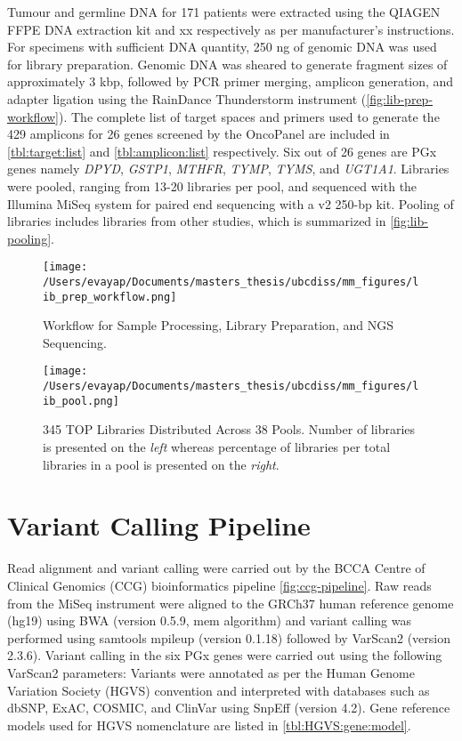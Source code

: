 Tumour and germline DNA for 171 patients were extracted using the QIAGEN FFPE DNA extraction kit and xx respectively as per manufacturer's instructions. For specimens with sufficient DNA quantity, 250 ng of genomic DNA was used for library preparation. Genomic DNA was sheared to generate fragment sizes of approximately 3 kbp, followed by PCR primer merging, amplicon generation, and adapter ligation using the RainDance Thunderstorm instrument (\autoref{fig:lib-prep-workflow}). The complete list of target spaces and primers used to generate the 429 amplicons for 26 genes screened by the OncoPanel are included in \autoref{tbl:target:list} and \autoref{tbl:amplicon:list} respectively. Six out of 26 genes are PGx genes namely \textit{DPYD}, \textit{GSTP1}, \textit{MTHFR}, \textit{TYMP}, \textit{TYMS}, and \textit{UGT1A1}. Libraries were pooled, ranging from 13-20 libraries per pool, and sequenced with the Illumina MiSeq system for paired end sequencing with a v2 250-bp kit. Pooling of libraries includes libraries from other studies, which is summarized in \autoref{fig:lib-pooling}.

\begin{figure}
    \centering
    \texttt{[image: /Users/evayap/Documents/masters\_thesis/ubcdiss/mm\_figures/lib\_prep\_workflow.png]}
    \caption{Workflow for Sample Processing, Library Preparation, and NGS Sequencing.}
    \label{fig:lib-prep-workflow}   %
\end{figure}

\begin{figure}
    \centering
    \texttt{[image: /Users/evayap/Documents/masters\_thesis/ubcdiss/mm\_figures/lib\_pool.png]}
    \caption{345 TOP Libraries Distributed Across 38 Pools. Number of libraries is presented on the \textit{left} whereas percentage of libraries per total libraries in a pool is presented on the \textit{right}.}
    \label{fig:lib-pooling}   %
\end{figure}

\section{Variant Calling Pipeline}
\label{sec:VariantCallingPipeline}

Read alignment and variant calling were carried out by the BCCA Centre of Clinical Genomics (CCG) bioinformatics pipeline \autoref{fig:ccg-pipeline}. Raw reads from the MiSeq instrument were aligned to the GRCh37 human reference genome (hg19) using BWA (version 0.5.9, mem algorithm) and variant calling was performed using samtools mpileup (version 0.1.18) followed by VarScan2 (version 2.3.6). Variant calling in the six PGx genes were carried out using the following VarScan2 parameters: Variants were annotated as per the Human Genome Variation Society (HGVS) convention and interpreted with databases such as dbSNP, ExAC, COSMIC, and ClinVar using SnpEff (version 4.2). Gene reference models used for HGVS nomenclature are listed in \autoref{tbl:HGVS:gene:model}.


